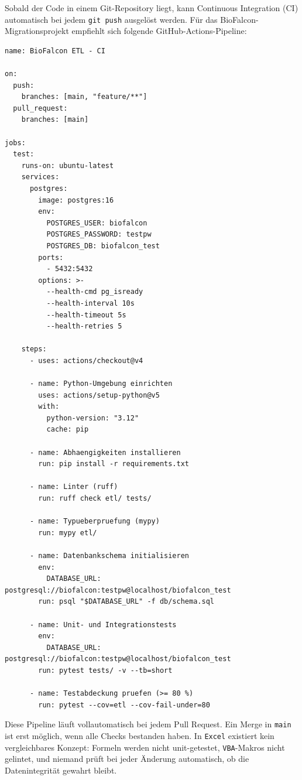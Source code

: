 \documentclass[12pt,a4paper]{report}
\theoremstyle{definition}
\theoremstyle{remark}
\newcommand{\excel}{\texttt{Excel}}
\newcommand{\vba}{\texttt{VBA}}
\newcommand{\code}[1]{\texttt{#1}}
\begin{document}
Sobald der Code in einem Git-Repository liegt, kann Continuous Integration
(CI) automatisch bei jedem \code{git push} ausgelöst werden.
Für das BioFalcon-Migrationsprojekt empfiehlt sich folgende
GitHub-Actions-Pipeline:

\begin{lstlisting}[style=yaml, caption={.github/workflows/ci.yml -- Automatisierte Tests und Lint}]
name: BioFalcon ETL - CI

on:
  push:
    branches: [main, "feature/**"]
  pull_request:
    branches: [main]

jobs:
  test:
    runs-on: ubuntu-latest
    services:
      postgres:
        image: postgres:16
        env:
          POSTGRES_USER: biofalcon
          POSTGRES_PASSWORD: testpw
          POSTGRES_DB: biofalcon_test
        ports:
          - 5432:5432
        options: >-
          --health-cmd pg_isready
          --health-interval 10s
          --health-timeout 5s
          --health-retries 5

    steps:
      - uses: actions/checkout@v4

      - name: Python-Umgebung einrichten
        uses: actions/setup-python@v5
        with:
          python-version: "3.12"
          cache: pip

      - name: Abhaengigkeiten installieren
        run: pip install -r requirements.txt

      - name: Linter (ruff)
        run: ruff check etl/ tests/

      - name: Typueberpruefung (mypy)
        run: mypy etl/

      - name: Datenbankschema initialisieren
        env:
          DATABASE_URL: postgresql://biofalcon:testpw@localhost/biofalcon_test
        run: psql "$DATABASE_URL" -f db/schema.sql

      - name: Unit- und Integrationstests
        env:
          DATABASE_URL: postgresql://biofalcon:testpw@localhost/biofalcon_test
        run: pytest tests/ -v --tb=short

      - name: Testabdeckung pruefen (>= 80 %)
        run: pytest --cov=etl --cov-fail-under=80
\end{lstlisting}

Diese Pipeline läuft vollautomatisch bei jedem Pull Request.
Ein Merge in \code{main} ist erst möglich, wenn alle Checks
bestanden haben. In \excel{} existiert kein vergleichbares
Konzept: Formeln werden nicht unit-getestet, \vba-Makros nicht
gelintet, und niemand prüft bei jeder Änderung automatisch,
ob die Datenintegrität gewahrt bleibt.
\end{document}
